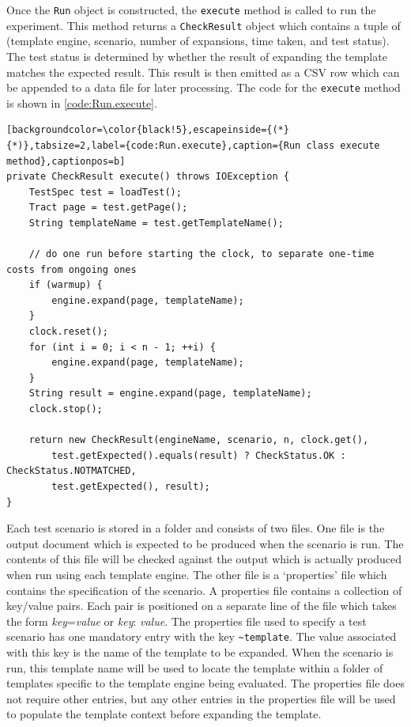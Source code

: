 Once the \verb!Run! object is constructed, the \verb!execute! method is called to run the experiment. This method returns a \verb!CheckResult! object which contains a tuple of (template engine, scenario, number of expansions, time taken, and test status). The test status is determined by whether the result of expanding the template matches the expected result. This result is then emitted as a CSV row which can be appended to a data file for later processing. The code for the \verb!execute! method is shown in \autoref{code:Run.execute}.

\begin{lstlisting}[backgroundcolor=\color{black!5},escapeinside={(*}{*)},tabsize=2,label={code:Run.execute},caption={Run class execute method},captionpos=b]
private CheckResult execute() throws IOException {
    TestSpec test = loadTest();
    Tract page = test.getPage();
    String templateName = test.getTemplateName();

    // do one run before starting the clock, to separate one-time costs from ongoing ones
    if (warmup) {
        engine.expand(page, templateName);
    }
    clock.reset();
    for (int i = 0; i < n - 1; ++i) {
        engine.expand(page, templateName);
    }
    String result = engine.expand(page, templateName);
    clock.stop();

    return new CheckResult(engineName, scenario, n, clock.get(),
        test.getExpected().equals(result) ? CheckStatus.OK : CheckStatus.NOTMATCHED,
        test.getExpected(), result);
}
\end{lstlisting}

Each test scenario is stored in a folder and consists of two files. One file is the output document which is expected to be produced when the scenario is run. The contents of this file will be checked against the output which is actually produced when run using each template engine. The other file is a `properties' file which contains the specification of the scenario. A properties file contains a collection of key/value pairs. Each pair is positioned on a separate line of the file which takes the form \emph{key}=\emph{value} or \emph{key}: \emph{value}. The properties file used to specify a test scenario has one mandatory entry with the key \verb!~template!. The value associated with this key is the name of the template to be expanded. When the scenario is run, this template name will be used to locate the template within a folder of templates specific to the template engine being evaluated. The properties file does not require other entries, but any other entries in the properties file will be used to populate the template context before expanding the template.

